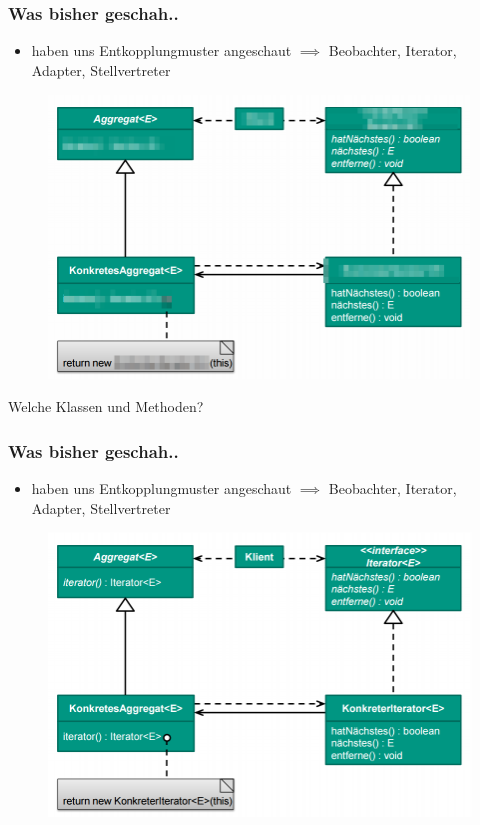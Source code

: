 \documentclass[18pt]{beamer}
\begin{document}
	\begin{frame}
		\frametitle{Was bisher geschah..}
		\begin{itemize}
			\item haben uns Entkopplungmuster angeschaut
			\linebreak $\implies$ Beobachter, Iterator, Adapter, Stellvertreter
		\end{itemize}
		\begin{figure}
			\includegraphics[scale=0.25]{./pics/tut4/iter-mod.png}
		\end{figure}
		Welche Klassen und Methoden?
	\end{frame}
	
	\begin{frame}
		\frametitle{Was bisher geschah..}
		\begin{itemize}
			\item haben uns Entkopplungmuster angeschaut
			\linebreak $\implies$ Beobachter, Iterator, Adapter, Stellvertreter
		\end{itemize}
		\begin{figure}
			\includegraphics[scale=0.35]{./pics/tut3/iter.png}
		\end{figure}
	\end{frame}
	
\end{document}
